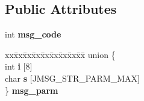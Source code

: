 \subsection*{Public Attributes}
\begin{DoxyCompactItemize}
\item 
\mbox{\label{structjpeg__error__mgr_a27fcf9391530acf9075836c5d11fff00}} 
int {\bfseries msg\+\_\+code}
\item 
\mbox{\label{structjpeg__error__mgr_acd2481ae9338d046fe8af85292703988}} 
\begin{tabbing}
xx\=xx\=xx\=xx\=xx\=xx\=xx\=xx\=xx\=\kill
union \{\\
\>int {\bfseries i} \mbox{[}8\mbox{]}\\
\>char {\bfseries s} \mbox{[}JMSG\_STR\_PARM\_MAX\mbox{]}\\
\} {\bfseries msg\_parm}\\


\end{tabbing}
\end{DoxyCompactItemize}
